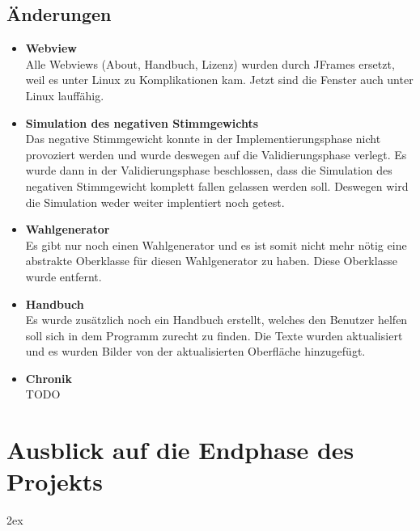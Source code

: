 \documentclass[12pt,a4paper,titlepage]{article}
\begin{document}
\subsection{Änderungen}
\begin{itemize}


\item{\bf{Webview}}\\
Alle Webviews (About, Handbuch, Lizenz) wurden durch JFrames ersetzt, weil es unter Linux zu Komplikationen kam. Jetzt sind die Fenster auch unter Linux lauffähig.\\

\item{\bf{Simulation des negativen Stimmgewichts}}\\
Das negative Stimmgewicht konnte in der Implementierungsphase nicht provoziert werden und wurde deswegen auf die Validierungsphase verlegt. Es wurde dann in der Validierungsphase beschlossen, dass die Simulation des negativen Stimmgewicht komplett fallen gelassen werden soll. Deswegen wird die Simulation weder weiter implentiert noch getest.

\item{\bf{Wahlgenerator}}\\
Es gibt nur noch einen Wahlgenerator und es ist somit nicht mehr nötig eine abstrakte Oberklasse für diesen Wahlgenerator zu haben. Diese Oberklasse wurde entfernt.

\item{\bf{Handbuch}}\\
Es wurde zusätzlich noch ein Handbuch erstellt, welches den Benutzer helfen soll sich in dem Programm zurecht zu finden. Die Texte wurden aktualisiert und es wurden Bilder von der aktualisierten Oberfläche hinzugefügt. 

\item{\bf{Chronik}}\\
TODO

\end{itemize}

\section{Ausblick auf die Endphase des Projekts}


\begingroup
\parindent 0pt
\parskip 2ex
\def\enotesize{\normalsize}

\endgroup
\end{document}
